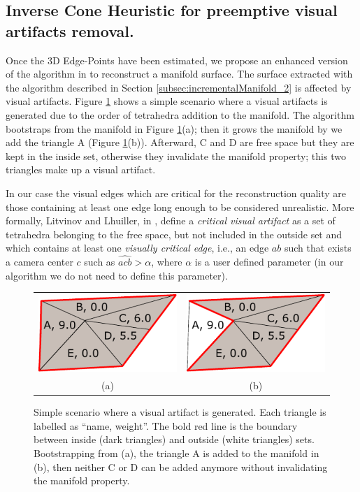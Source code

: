 \subsection{Inverse Cone Heuristic for preemptive visual artifacts removal.}
\label{sec:visualartifacts}
Once the 3D Edge-Points have been estimated, we propose an enhanced version of the algorithm in \cite{litvinov_lhuillier_13} to reconstruct a manifold surface.
The surface extracted with the algorithm described in Section \ref{subsec:incrementalManifold_2} is affected by visual artifacts.
Figure \ref{fig:artifact} shows a simple scenario where a visual artifacts is generated due to the order of tetrahedra addition to the manifold.
The algorithm bootstraps from the manifold in Figure \ref{fig:artifact}(a); then it grows the manifold by we add the triangle A (Figure \ref{fig:artifact}(b)). Afterward, C and D are free space but they are kept in the inside set, otherwise they invalidate the manifold property; this two triangles make up a visual artifact.

In our case the visual edges which are critical for the reconstruction quality are those containing at least one edge long enough to be considered unrealistic. 
More formally, Litvinov and Lhuiller, in \cite{litvinov_Lhiuller14}, define a \emph{critical visual artifact} as a set of tetrahedra belonging to the free space, but not included in the outside set and which contains at least one \emph{visually critical edge}, i.e., an edge $ab$ such that exists a camera center $c$ such as $\widehat{acb}>\alpha$, where $\alpha$ is a user defined parameter (in our algorithm we do not need to define this parameter).
\begin{figure}
\centering
\begin{tabular}{cc}
\includegraphics[width=0.35\columnwidth]{./img//artifacts01}&
\includegraphics[width=0.35\columnwidth]{./img//artifacts02}\\
(a) & (b)
\end{tabular}
\caption{Simple scenario where a visual artifact is generated. Each triangle is labelled as ``name, weight''. The bold red line is the boundary between inside (dark triangles) and outside (white triangles) sets. Bootstrapping from (a), the triangle A is added to the manifold in (b), then neither C or D can be added anymore without invalidating the manifold property.}
\label{fig:artifact}
\end{figure}



